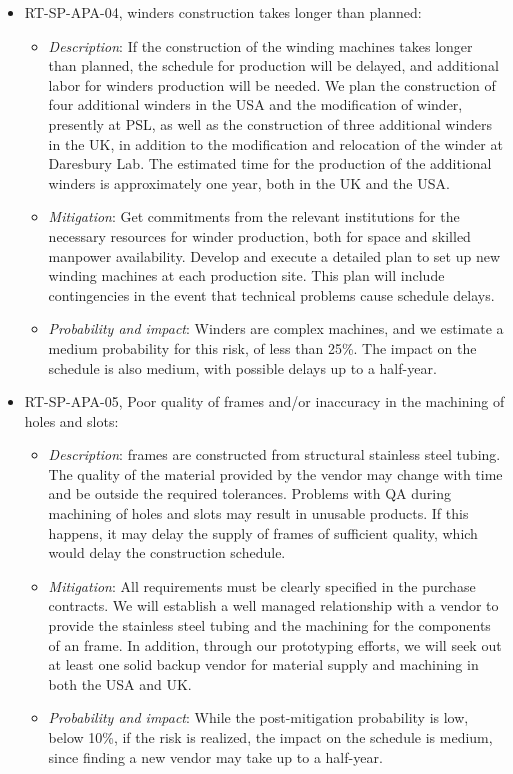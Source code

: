 \begin{itemize}
\item RT-SP-APA-04,  winders construction takes longer than planned:
\begin{itemize} %
\item \textit{Description}: If the construction of the winding machines takes longer than planned, the schedule for  production will be delayed, and additional labor for winders production will be needed. We plan the construction of four additional winders in the USA and the modification of winder, presently at PSL, as well as the construction of three additional winders in the UK, in addition to the modification and relocation of the winder at Daresbury Lab. The estimated time for the production of the additional winders is approximately one year, both in the UK and the USA.
\item \textit{Mitigation}: Get commitments from the relevant institutions for the necessary resources for winder production, both for space and skilled manpower availability. Develop and execute a detailed plan to set up new winding machines at each production site. This plan will include contingencies in the event that technical problems cause schedule delays.  
\item \textit{Probability and impact}: Winders are complex machines, and we estimate a medium probability for this risk, of less than 25\%. The impact on the schedule is also medium, with possible delays up to a half-year.
\end{itemize}

\item RT-SP-APA-05, Poor quality of  frames and/or inaccuracy in the machining of holes and slots:
\begin{itemize} %
\item \textit{Description}:  frames are constructed from structural stainless steel tubing. The quality of the material provided by the vendor may change with time and be outside the required tolerances. Problems with QA during machining of holes and slots may result in unusable products. If this happens, it may delay the supply of frames of sufficient quality, which would delay the  construction schedule.
\item \textit{Mitigation}: All requirements must be clearly specified in the purchase contracts. We will establish a well managed relationship with a vendor to provide the stainless steel tubing and the machining for the components of an  frame. In addition, through our prototyping efforts, we will seek out at least one solid backup vendor for material supply and machining in both the USA and UK.
\item \textit{Probability and impact}: While the post-mitigation probability is low, below 10\%, if the risk is realized, the impact on the schedule is medium, since finding a new vendor may take up to a half-year.
\end{itemize}


\end{itemize}
